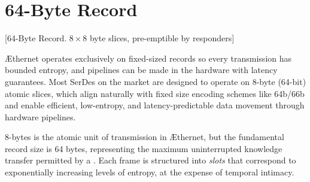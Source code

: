 \documentclass[../../../OAE-SPEC-MAIN.tex]{subfiles}
\begin{document}
\section{64-Byte Record}
[64-Byte Record. $8\times8$ byte slices, pre-emptible by responders]




\AE thernet operates exclusively on fixed-sized records so every transmission has bounded entropy, and pipelines can be made in the hardware with latency guarantees. Most SerDes on the market are designed to operate on 8-byte (64-bit) atomic slices, which align naturally with fixed size encoding schemes like 64b/66b and enable efficient, low-entropy, and latency-predictable data movement through hardware pipelines.

8-bytes is the atomic unit of transmission in \AE thernet, but the fundamental record size is 64 bytes, representing the maximum uninterrupted knowledge transfer permitted by a \LINK. Each frame is structured into \emph{slots} that correspond to exponentially increasing levels of entropy, at the expense of temporal intimacy.
\end{document}
